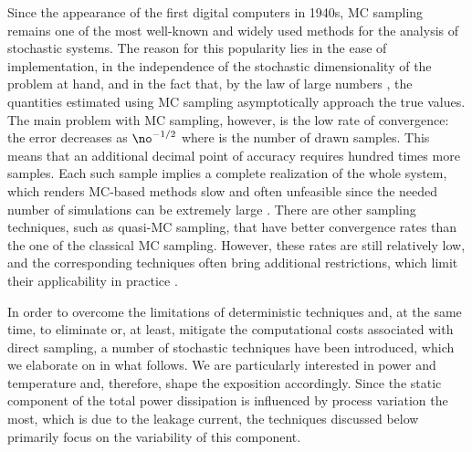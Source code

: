 Since the appearance of the first digital computers in 1940s, \acf{MC} sampling
remains one of the most well-known and widely used methods for the analysis of
stochastic systems. The reason for this popularity lies in the ease of
implementation, in the independence of the stochastic dimensionality of the
problem at hand, and in the fact that, by the law of large numbers
\cite{durrett2010}, the quantities estimated using \ac{MC} sampling
asymptotically approach the true values. The main problem with \ac{MC} sampling,
however, is the low rate of convergence: the error decreases as $\no^{-1/2}$
where \no is the number of drawn samples. This means that an additional decimal
point of accuracy requires hundred times more samples. Each such sample implies
a complete realization of the whole system, which renders \ac{MC}-based methods
slow and often unfeasible since the needed number of simulations can be
extremely large \cite{diaz-emparanza2002}. There are other sampling techniques,
such as quasi-\ac{MC} sampling, that have better convergence rates than the one
of the classical \ac{MC} sampling. However, these rates are still relatively
low, and the corresponding techniques often bring additional restrictions, which
limit their applicability in practice \cite{xiu2010}.

In order to overcome the limitations of deterministic techniques and, at the
same time, to eliminate or, at least, mitigate the computational costs
associated with direct sampling, a number of stochastic techniques have been
introduced, which we elaborate on in what follows. We are particularly
interested in power and temperature and, therefore, shape the exposition
accordingly. Since the static component of the total power dissipation is
influenced by process variation the most, which is due to the leakage current,
the techniques discussed below primarily focus on the variability of this
component.

